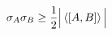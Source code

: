 

\vspace*{\fill}
\centering

\begin{align*}
    \sigma_{A}\sigma_{B} \geq \frac{1}{2}\Big| \expval{[A,B]} \Big|
\end{align*}

\centering
\vspace*{\fill}

